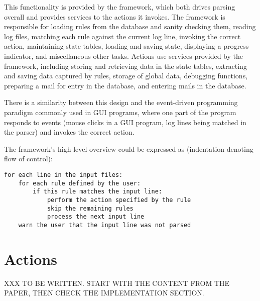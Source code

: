 This functionality is provided by the framework, which both drives parsing
overall and provides services to the actions it invokes.  The framework is
responsible for loading rules from the database and sanity checking them,
reading log files, matching each rule against the current log line,
invoking the correct action, maintaining state tables, loading and saving
state, displaying a progress indicator, and miscellaneous other tasks.
Actions use services provided by the framework, including storing and
retrieving data in the state tables, extracting and saving data captured by
rules, storage of global data, debugging functions, preparing a mail for
entry in the database, and entering mails in the database.

There is a similarity between this design and the event-driven programming
paradigm commonly used in GUI programs, where one part of the program
responds to events (mouse clicks in a GUI program, log lines being matched
in the parser) and invokes the correct action.

The framework's high level overview could be expressed as (indentation
denoting flow of control):

\begin{verbatim}
for each line in the input files:
    for each rule defined by the user:
        if this rule matches the input line:
            perform the action specified by the rule
            skip the remaining rules
            process the next input line
    warn the user that the input line was not parsed
\end{verbatim}


\section{Actions}

\label{actions in architecture}

XXX TO BE WRITTEN\@.  START WITH THE CONTENT FROM THE PAPER, THEN CHECK THE
IMPLEMENTATION SECTION\@.


